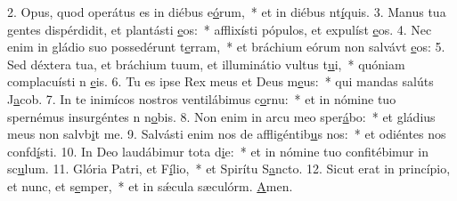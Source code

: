 2. Opus, quod operátus es in diébus e\uline{ó}rum,~* et in diébus nt\uline{í}quis.
3. Manus tua gentes dispérdidit, et plantásti \uline{e}os:~* afflixísti pópulos, et expulíst \uline{e}os.
4. Nec enim in gládio suo possedérunt t\uline{e}rram,~* et bráchium eórum non salvávt \uline{e}os:
5. Sed déxtera tua, et bráchium tuum, et illuminátio vultus t\uline{u}i,~* quóniam complacuísti n \uline{e}is.
6. Tu es ipse Rex meus et Deus m\uline{e}us:~* qui mandas salúts J\uline{a}cob.
7. In te inimícos nostros ventilábimus c\uline{o}rnu:~* et in nómine tuo spernémus insurgéntes n n\uline{o}bis.
8. Non enim in arcu meo sper\uline{á}bo:~* et gládius meus non salvb\uline{i}t me.
9. Salvásti enim nos de affligéntib\uline{u}s nos:~* et odiéntes nos confd\uline{í}sti.
10. In Deo laudábimur tota d\uline{i}e:~* et in nómine tuo confitébimur in sc\uline{u}lum.
11. Glória Patri, et F\uline{í}lio,~* et Spirítu S\uline{a}ncto.
12. Sicut erat in princípio, et nunc, et s\uline{e}mper,~* et in sǽcula sæculórm. \uline{A}men.

